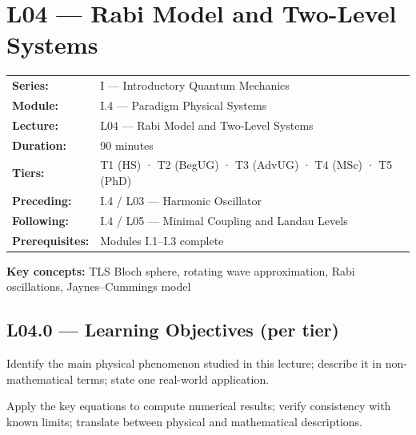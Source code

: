 \renewcommand{\lectureCode}{I.4 / L04}

\section*{L04 — Rabi Model and Two-Level Systems}
\label{sec:L04}

\begin{tcolorbox}[lecturebox, title={Module I.4 / L04 — Metadata}]
\begin{tabular}{@{}ll@{}}
\textbf{Series:}    & I — Introductory Quantum Mechanics \\
\textbf{Module:}    & I.4 — Paradigm Physical Systems \\
\textbf{Lecture:}   & L04 — Rabi Model and Two-Level Systems \\
\textbf{Duration:}  & 90 minutes \\
\textbf{Tiers:}     & T1 (HS) · T2 (BegUG) · T3 (AdvUG) · T4 (MSc) · T5 (PhD) \\
\textbf{Preceding:} & I.4 / L03 — Harmonic Oscillator \\
\textbf{Following:} & I.4 / L05 — Minimal Coupling and Landau Levels \\
\textbf{Prerequisites:} & Modules I.1–I.3 complete \\
\end{tabular}

\medskip
\textbf{Key concepts:} TLS Bloch sphere, rotating wave approximation, Rabi oscillations, Jaynes–Cummings model
\end{tcolorbox}

\subsection*{L04.0 — Learning Objectives (per tier)}
\label{sec:L04.0}

\quad
Identify the main physical phenomenon studied in this lecture; describe it in
non-mathematical terms; state one real-world application.

\quad
Apply the key equations to compute numerical results; verify consistency with
known limits; translate between physical and mathematical descriptions.

